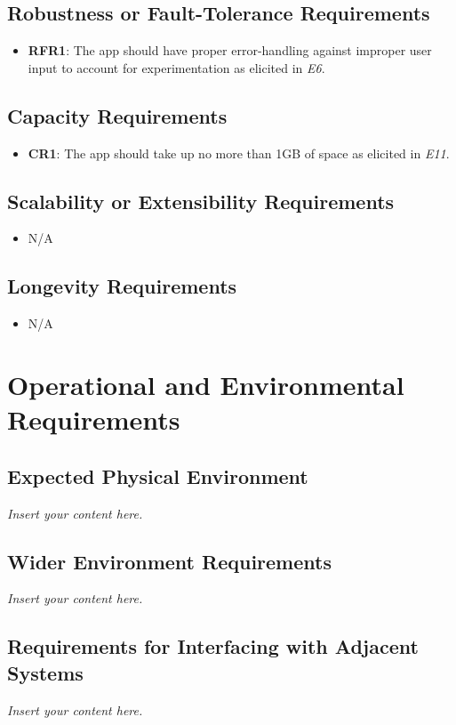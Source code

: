 \documentclass[12pt]{article}
\newcommand{\lips}{\textit{Insert your content here.}}
\begin{document}
\subsection{Robustness or Fault-Tolerance Requirements}
\begin{itemize}
  \item \textbf{RFR1}: The app should have proper error-handling against improper user input to account for
  experimentation as elicited in \textit{E6}.
\end{itemize}
\subsection{Capacity Requirements}
\begin{itemize}
  \item \textbf{CR1}: The app should take up no more than 1GB of space as elicited in \textit{E11}.
\end{itemize}
\subsection{Scalability or Extensibility Requirements}
\begin{itemize}
  \item N/A
\end{itemize}
\subsection{Longevity Requirements}
\begin{itemize}
  \item N/A
\end{itemize}

\section{Operational and Environmental Requirements}
\subsection{Expected Physical Environment}
\lips
\subsection{Wider Environment Requirements}
\lips
\subsection{Requirements for Interfacing with Adjacent Systems}
\lips
\end{document}
